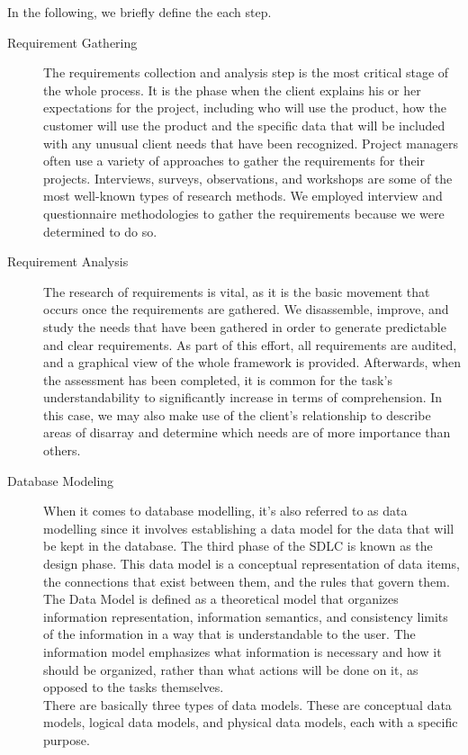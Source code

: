 In the following, we briefly define the each step.
\begin{description}
\item [Requirement Gathering] The requirements collection and analysis step is the most critical stage of the whole process. It is the phase when the client explains his or her expectations for the project, including who will use the product, how the customer will use the product and the specific data that will be included with any unusual client needs that have been recognized. Project managers often use a variety of approaches to gather the requirements for their projects. Interviews, surveys, observations, and workshops are some of the most well-known types of research methods. We employed interview and questionnaire methodologies to gather the requirements because we were determined to do so.
\item[Requirement Analysis] The research of requirements is vital, as it is the basic movement that occurs once the requirements are gathered. We disassemble, improve, and study the needs that have been gathered in order to generate predictable and clear requirements. As part of this effort, all requirements are audited, and a graphical view of the whole framework is provided. Afterwards, when the assessment has been completed, it is common for the task's understandability to significantly increase in terms of comprehension. In this case, we may also make use of the client's relationship to describe areas of disarray and determine which needs are of more importance than others.
\item[Database Modeling] When it comes to database modelling, it's also referred to as data modelling since it involves establishing a data model for the data that will be kept in the database. The third phase of the SDLC is known as the design phase. This data model is a conceptual representation of data items, the connections that exist between them, and the rules that govern them. The Data Model is defined as a theoretical model that organizes information representation, information semantics, and consistency limits of the information in a way that is understandable to the user. The information model emphasizes what information is necessary and how it should be organized, rather than what actions will be done on it, as opposed to the tasks themselves.\\

There are basically three types of data models. These are conceptual data models, logical data models, and physical data models,  each with a specific purpose.\cite{wikipedia_2022}\\


\end{description}
